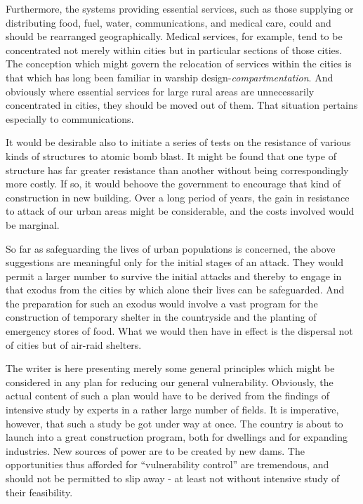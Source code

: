 Furthermore, the systems providing essential services, such as those supplying or distributing food, fuel, water, communications, and medical care, could and should be rearranged geographically. Medical services, for example, tend to be concentrated not merely within cities but in particular sections of those cities. The conception which might govern the relocation of services within the cities is that which has long been familiar in warship design-\emph{compartmentation}. And obviously where essential services for large rural areas are unnecessarily concentrated in cities, they should be moved out of them. That situation pertains especially to communications.

It would be desirable also to initiate a series of tests on the resistance of various kinds of structures to atomic bomb blast. It might be found that one type of structure has far greater resistance than another without being correspondingly more costly. If so, it would behoove the government to encourage that kind of construction in new building. Over a long period of years, the gain in resistance to attack of our urban areas might be considerable, and the costs involved would be marginal.

So far as safeguarding the lives of urban populations is concerned, the above suggestions are meaningful only for the initial stages of an attack. They would permit a larger number to survive the initial attacks and thereby to engage in that exodus from the cities by which alone their lives can be safeguarded. And the preparation for such an exodus would involve a vast program for the construction of temporary shelter in the countryside and the planting of emergency stores of food. What we would then have in effect is the dispersal not of cities but of air-raid shelters.

The writer is here presenting merely some general principles which might be
considered in any plan for reducing our general vulnerability. Obviously, the
actual content of such a plan would have to be derived from the findings of intensive
study by experts in a rather large number of fields. It is imperative,
however, that such a study be got under way at once. The country is about to
launch into a great construction program, both for dwellings and for expanding
industries. New sources of power are to be created by new dams. The opportunities
thus afforded for ``vulnerability control'' are tremendous, and should not be
permitted to slip away - at least not without intensive study of their feasibility.

